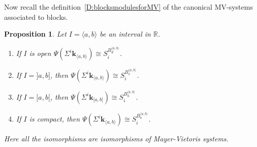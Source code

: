 \documentclass[a4paper, english, 11pt]{article}
\newcommand{\kk}[0]{\textbf{k}}
\newcommand{\0}{\vec{0}}
\newcommand{\R}[0]{\mathbb{R}}
\newtheorem{prop}{Proposition}[section]
\begin{document}
Now recall the definition~\ref{D:blocksmodulesforMV} of the canonical MV-systems associated to blocks.
\begin{prop}\label{P:PsionIntervals}  Let $I=\langle a, b\rangle$ be an interval in $\R$. 
\begin{enumerate}
    \item If $I$ is open  $\Psi ({\Sigma^i \kk_{\langle a, b\rangle}}) \cong 
S_i^{B_{d}^{\langle a, b\rangle}}$.
    \item If $I=]a,b]$, then  $\Psi ({\Sigma^i \kk_{\langle a, b\rangle}}) \cong 
S_i^{B_{v}^{\langle a, b\rangle}}$.
    \item If $I=[a, b[$, then  $\Psi ({\Sigma^i \kk_{[ a, b[}}) \cong 
S_i^{B_{h}^{\langle a, b\rangle}}$. 
    \item If $I$ is compact, then  $\Psi ({\Sigma^i \kk_{\langle a, b\rangle}}) \cong 
S_i^{B_{b}^{\langle a, b\rangle}}$. 
\end{enumerate}
Here all the isomorphisms are isomorphisms of Mayer-Vietoris systems.
\end{prop}
\end{document}
